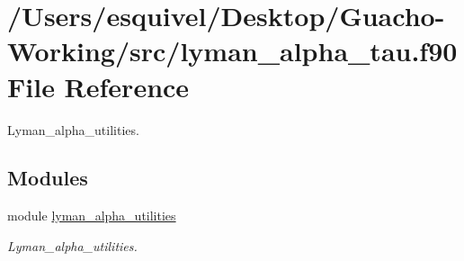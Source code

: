 \hypertarget{lyman__alpha__tau_8f90}{}\section{/\+Users/esquivel/\+Desktop/\+Guacho-\/\+Working/src/lyman\+\_\+alpha\+\_\+tau.f90 File Reference}
\label{lyman__alpha__tau_8f90}


Lyman\+\_\+alpha\+\_\+utilities.  


\subsection*{Modules}
\begin{DoxyCompactItemize}
\item 
module \hyperlink{namespacelyman__alpha__utilities}{lyman\+\_\+alpha\+\_\+utilities}
\begin{DoxyCompactList}\small\item\em Lyman\+\_\+alpha\+\_\+utilities. \end{DoxyCompactList}\end{DoxyCompactItemize}

